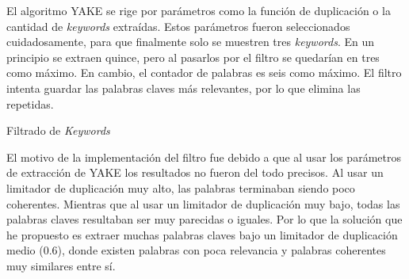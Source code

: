 El algoritmo \ac{YAKE} se rige por parámetros como la función de duplicación o la cantidad de \textit{keywords} extraídas. Estos parámetros fueron seleccionados cuidadosamente, para que finalmente solo se muestren tres \textit{keywords}. En un principio se extraen quince, pero al pasarlos por el filtro se quedarían en tres como máximo. En cambio, el contador de palabras es seis como máximo. El filtro intenta guardar las palabras claves más relevantes, por lo que elimina las repetidas.

\vspace{0.3cm}

\begin{algorithm}[H]


    \caption{Filtrado de \textit{Keywords}}

\end{algorithm}

El motivo de la implementación del filtro fue debido a que al usar los parámetros de extracción de \ac{YAKE} los resultados no fueron del todo precisos. Al usar un limitador de duplicación muy alto, las palabras terminaban siendo poco coherentes. Mientras que al usar un limitador de duplicación muy bajo, todas las palabras claves resultaban ser muy parecidas o iguales. Por lo que la solución que he propuesto es extraer muchas palabras claves bajo un limitador de duplicación medio (0.6), donde existen palabras con poca relevancia y palabras coherentes muy similares entre sí.

